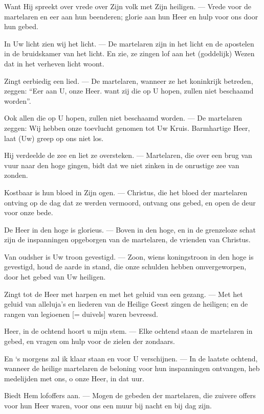 \documentclass[12pt,twoside,a5paper]{article}
\begin{document}
\begin{halfparskip}
   Want Hij spreekt over vrede over Zijn volk met Zijn heiligen. --- Vrede voor de martelaren en eer aan hun beenderen; glorie aan hun Heer en hulp voor ons door hun gebed.

  In Uw licht zien wij het licht. --- De martelaren zijn in het licht en de apostelen in de bruidskamer van het licht. En zie, ze zingen lof aan het (goddelijk) Wezen dat in het verheven licht woont.

  Zingt eerbiedig een lied. --- De martelaren, wanneer ze het koninkrijk betreden, zeggen: ``Eer aan U, onze Heer. want zij die op U hopen, zullen niet beschaamd worden''.

  Ook allen die op U hopen, zullen niet beschaamd worden. --- De martelaren zeggen: Wij hebben onze toevlucht genomen tot Uw Kruis. Barmhartige Heer, laat (Uw) greep op ons niet los.

  Hij verdeelde de zee en liet ze oversteken. --- Martelaren, die over een brug van vuur naar den hoge gingen, bidt dat we niet zinken in de onrustige zee van zonden.

  Kostbaar is hun bloed in Zijn ogen. --- Christus, die het bloed der martelaren ontving op de dag dat ze werden vermoord, ontvang ons gebed, en open de deur voor onze bede.

  De Heer in den hoge is glorieus. --- Boven in den hoge, en in de grenzeloze schat zijn de inspanningen opgeborgen van de martelaren, de vrienden van Christus.

  Van oudsher is Uw troon gevestigd. --- Zoon, wiens koningstroon in den hoge is gevestigd, houd de aarde in stand, die onze schulden hebben omvergeworpen, door het gebed van Uw heiligen.

  Zingt tot de Heer met harpen en met het geluid van een gezang. --- Met het geluid van alleluja's en liederen van de Heilige Geest zingen de heiligen; en de rangen van legioenen [= duivels] waren bevreesd.

  Heer, in de ochtend hoort u mijn stem. --- Elke ochtend staan de martelaren in gebed, en vragen om hulp voor de zielen der zondaars.

  En `s morgens zal ik klaar staan en voor U verschijnen. --- In de laatste ochtend, wanneer de heilige martelaren de beloning voor hun inspanningen ontvangen, heb medelijden met ons, o onze Heer, in dat uur.

  Biedt Hem lofoffers aan. --- Mogen de gebeden der martelaren, die zuivere offers voor hun Heer waren, voor ons een muur bij nacht en bij dag zijn.


\end{halfparskip}
\end{document}

